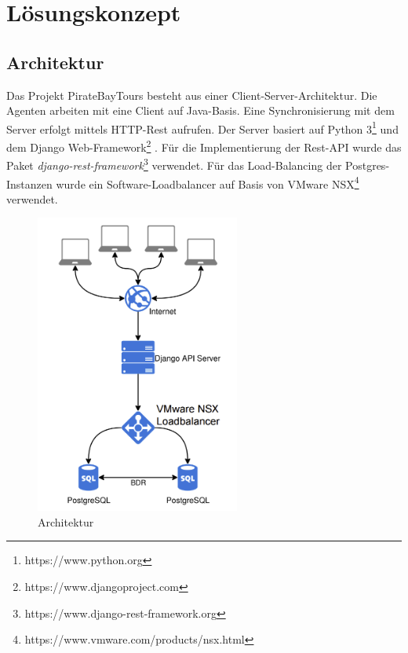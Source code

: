 \documentclass[12pt,a4paper,ngerman,english]{report}
\begin{document}
\chapter{Lösungskonzept}
\section{Architektur}

Das Projekt PirateBayTours besteht aus einer Client-Server-Architektur.
Die Agenten arbeiten mit eine Client auf Java-Basis. Eine Synchronisierung mit dem Server erfolgt mittels HTTP-Rest aufrufen. Der Server basiert auf Python 3\footnote{https://www.python.org} und dem Django Web-Framework\footnote{https://www.djangoproject.com} . Für die Implementierung der Rest-API wurde das Paket \textit{django-rest-framework}\footnote{https://www.django-rest-framework.org} verwendet. Für das Load-Balancing der Postgres-Instanzen wurde ein Software-Loadbalancer auf Basis von VMware NSX\footnote{https://www.vmware.com/products/nsx.html} verwendet.

\begin{figure}[h]
	\centering
	\includegraphics[width=0.6\textwidth]{img/architecture.png}
	\caption{Architektur}
	\label{fig:architecture}
\end{figure}
\end{document}
